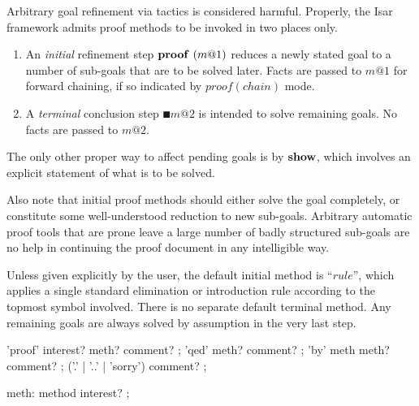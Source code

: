 Arbitrary goal refinement via tactics is considered harmful.  Properly, the
Isar framework admits proof methods to be invoked in two places only.
\begin{enumerate}
\item An \emph{initial} refinement step $\PROOF{m@1}$ reduces a newly stated
  goal to a number of sub-goals that are to be solved later.  Facts are passed
  to $m@1$ for forward chaining, if so indicated by $proof(chain)$ mode.
  
\item A \emph{terminal} conclusion step $\QED{m@2}$ is intended to solve
  remaining goals.  No facts are passed to $m@2$.
\end{enumerate}

The only other proper way to affect pending goals is by ${\mathord{\mathbf{show}}}$, which
involves an explicit statement of what is to be solved.

\medskip

Also note that initial proof methods should either solve the goal completely,
or constitute some well-understood reduction to new sub-goals.  Arbitrary
automatic proof tools that are prone leave a large number of badly structured
sub-goals are no help in continuing the proof document in any intelligible
way.

\medskip

Unless given explicitly by the user, the default initial method is ``$rule$'',
which applies a single standard elimination or introduction rule according to
the topmost symbol involved.  There is no separate default terminal method.
Any remaining goals are always solved by assumption in the very last step.

\begin{rail}
  'proof' interest? meth? comment?
  ;
  'qed' meth? comment?
  ;
  'by' meth meth? comment?
  ;
  ('.' | '..' | 'sorry') comment?
  ;

  meth: method interest?
  ;
\end{rail}

